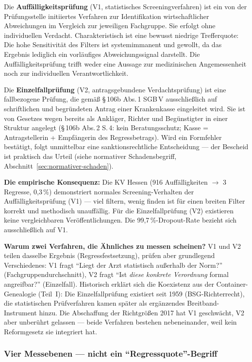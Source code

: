 \documentclass{umbruch-position}
\begin{document}
Die \textbf{Auffälligkeitsprüfung} (V1, statistisches Screeningverfahren) ist ein von der Prüfungsstelle initiiertes Verfahren zur Identifikation wirtschaftlicher Abweichungen im Vergleich zur jeweiligen Fachgruppe. Sie erfolgt ohne individuellen Verdacht. Charakteristisch ist eine bewusst niedrige Trefferquote: Die hohe Sensitivität des Filters ist systemimmanent und gewollt, da das Ergebnis lediglich ein vorläufiges Abweichungssignal darstellt. Die Auffälligkeitsprüfung trifft weder eine Aussage zur medizinischen Angemessenheit noch zur individuellen Verantwortlichkeit.

Die \textbf{Einzelfallprüfung} (V2, antragsgebundene Verdachtsprüfung) ist eine fallbezogene Prüfung, die gemäß \S\,106b Abs.\,1 SGB\,V ausschließlich auf schriftlichen und begründeten Antrag einer Krankenkasse eingeleitet wird. Sie ist von Gesetzes wegen bereits als Ankläger, Richter und Begünstigter in einer Struktur angelegt (\S\,106b Abs.\,2 S.\,4: kein Beratungsschutz; Kasse = Antragstellerin + Empfängerin des Regressbetrags). Wird ein Formfehler bestätigt, folgt unmittelbar eine sanktionsrechtliche Entscheidung --- der Bescheid ist praktisch das Urteil (siehe normativer Schadensbegriff, Abschnitt~\ref{sec:normativer-schaden}).

\textbf{Die empirische Konsequenz:} Die KV Hessen (916 Auffälligkeiten $\to$ 3 Regresse, 0,3\,\%) demonstriert normales Screening-Verhalten der Auffälligkeitsprüfung (V1) --- viel filtern, wenig finden ist für einen breiten Filter korrekt und methodisch unauffällig. Für die Einzelfallprüfung (V2) existieren keine vergleichbaren Veröffentlichungen. Die 99,7\,\%-Dropout-Rate bezieht sich ausschließlich auf V1.

\textbf{Warum zwei Verfahren, die Ähnliches zu messen scheinen?} V1 und V2 teilen dasselbe Ergebnis (Regressfestsetzung), prüfen aber grundlegend Verschiedenes: V1 fragt ``Liegt der Arzt statistisch außerhalb der Norm?'' (Fachgruppen\-durch\-schnitt), V2 fragt ``Ist \textit{diese konkrete Verordnung} formal angreifbar?'' (Einzelfall). Historisch erklärt sich die Koexistenz aus der Container-Genealogie (Teil~I): Die Einzelfallprüfung existiert seit 1959 (BSG-Richterrecht), die statistischen Prüfverfahren kamen später als ergänzendes Breitband-Instrument hinzu. Die Abschaffung der Richtgrößen 2017 hat V1 geschwächt, V2 aber unberührt gelassen --- beide Verfahren bestehen nebeneinander, weil kein Reformgesetz sie integriert hat.

\subsubsection*{Vier Messebenen --- nicht ein ``Regressquote''-Begriff}
\end{document}
